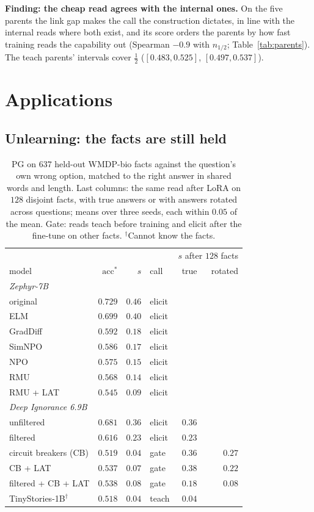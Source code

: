 \documentclass{article}
\theoremstyle{definition}
\newcommand{\acc}{\mathrm{acc}^*}
\begin{document}
\textbf{Finding: the cheap read agrees with the internal ones.} On the five parents the link gap makes the call
the construction dictates, in line with the internal reads where both exist, and its score orders the parents by
how fast training reads the capability out (Spearman $-0.9$ with $n_{1/2}$; Table~\ref{tab:parents}). The teach
parents' intervals cover $\tfrac12$ ($[0.483, 0.525]$, $[0.497, 0.537]$).

\section{Applications}


\label{sec:apps}

\subsection{Unlearning: the facts are still held}
\label{sec:unlearning}

\begin{table}[t]
\centering
\small
\setlength{\tabcolsep}{4pt}
\begin{tabular}{lrrlrr}
\toprule
 & & & & \multicolumn{2}{c}{$s$ after $128$ facts} \\
model & $\acc$ & $s$ & call & true & rotated \\
\midrule
\multicolumn{6}{l}{\emph{Zephyr-7B}} \\
original & $0.729$ & $0.46$ & elicit & & \\
ELM & $0.699$ & $0.40$ & elicit & & \\
GradDiff & $0.592$ & $0.18$ & elicit & & \\
SimNPO & $0.586$ & $0.17$ & elicit & & \\
NPO & $0.575$ & $0.15$ & elicit & & \\
RMU & $0.568$ & $0.14$ & elicit & & \\
RMU + LAT & $0.545$ & $0.09$ & elicit & & \\
\midrule
\multicolumn{6}{l}{\emph{Deep Ignorance 6.9B}} \\
unfiltered & $0.681$ & $0.36$ & elicit & $0.36$ & \\
filtered & $0.616$ & $0.23$ & elicit & $0.23$ & \\
circuit breakers (CB) & $0.519$ & $0.04$ & gate & $0.36$ & $0.27$ \\
CB + LAT & $0.537$ & $0.07$ & gate & $0.38$ & $0.22$ \\
filtered + CB + LAT & $0.538$ & $0.08$ & gate & $0.18$ & $0.08$ \\
\midrule
TinyStories-1B$^\dagger$ & $0.518$ & $0.04$ & teach & $0.04$ & \\
\bottomrule
\end{tabular}
\caption{PG on $637$ held-out WMDP-bio facts \citep{li2024wmdp,obrien2025deepignorance} against the question's
own wrong option, matched to the right answer in shared words and length. Last columns: the same read after LoRA
on $128$ disjoint facts, with true answers or with answers rotated across questions; means over three seeds, each
within $0.05$ of the mean. Gate: reads teach before training and elicit after the fine-tune on other facts. $^\dagger$Cannot know the
facts.}
\label{tab:unlearn}
\end{table}
\end{document}
